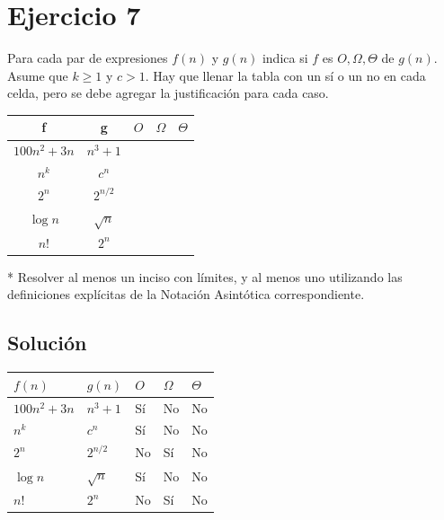 \section{Ejercicio 7}

\begin{tcolorbox}[enunciado]
Para cada par de expresiones $f(n)$ y $g(n)$ indica si $f$ es $O, \Omega, \Theta$ de $g(n)$. Asume que $k\ge1$ y $c>1$. Hay que llenar la tabla con un sí o un no en cada celda, pero se debe agregar la justificación para cada caso.

\begin{center}
\renewcommand{\arraystretch}{1.5}
\begin{tabular}{|c|c|c|c|c|}
\hline
\textbf{f} & \textbf{g} & $O$ & $\Omega$ & $\Theta$ \\ \hline
$100n^2+3n$ & $n^3+1$ & & & \\ \hline
$n^k$ & $c^n$ & & & \\ \hline
$2^n$ & $2^{n/2}$ & & & \\ \hline
$\log n$ & $\sqrt{n}$ & & & \\ \hline
$n!$ & $2^n$ & & & \\ \hline
\end{tabular}
\end{center}

* Resolver al menos un inciso con límites, y al menos uno utilizando las definiciones explícitas de la Notación Asintótica correspondiente.
\end{tcolorbox}

\subsection{Solución}

\begin{table}[htbp]
\centering
\renewcommand{\arraystretch}{1.8}
\begin{tabular}{|m{4.5cm}|m{3.5cm}|m{2cm}|m{2cm}|m{2cm}|}
\hline
\centering \textbf{$f(n)$} & \centering \textbf{$g(n)$} & \centering \textbf{$O$} & \centering \textbf{$\Omega$} & \centering \textbf{$\Theta$} \tabularnewline
\hline
$100n^2 + 3n$ & $n^3 + 1$ & \centering Sí & \centering No & \centering No \tabularnewline
\hline
$n^k$ & $c^n$ & \centering Sí & \centering No & \centering No \tabularnewline
\hline
$2^n$ & $2^{n/2}$ & \centering No & \centering Sí & \centering No \tabularnewline
\hline
$\log n$ & $\sqrt{n}$ & \centering Sí & \centering No & \centering No \tabularnewline
\hline
$n!$ & $2^n$ & \centering No & \centering Sí & \centering No \tabularnewline
\hline
\end{tabular}
\end{table}

